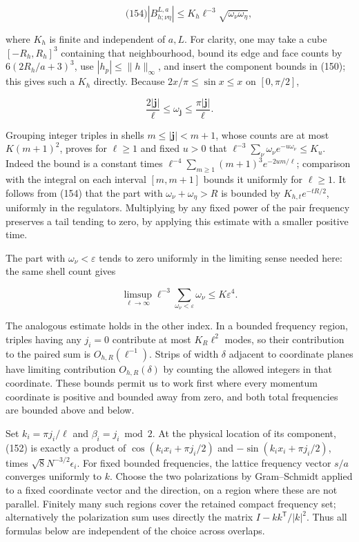 \[
\qquad\text{(154)}
 |B_{h;\nu\eta}^{L,a}|
       \le K_h\ell^{-3}\sqrt{\omega_\nu\omega_\eta},
\]

where \(K_h\) is finite and independent of \(a,L\). For clarity, one may
take a cube \([-R_h,R_h]^3\) containing that neighbourhood, bound its
edge and face counts by \(6(2R_h/a+3)^3\), use \(|h_p|\le\|h\|_\infty\),
and insert the component bounds in (150); this gives such a \(K_h\)
directly. Because \(2x/\pi\le\sin x\le x\) on \([0,\pi/2]\),

\[
\frac{2|\boldsymbol j|}{\ell}\le\omega_{\boldsymbol j}
       \le\frac{\pi|\boldsymbol j|}{\ell}.
\]

Grouping integer triples in shells \(m\le|\boldsymbol j|<m+1\), whose
counts are at most \(K(m+1)^2\), proves for \(\ell\ge1\) and fixed
\(u>0\) that \(\ell^{-3}\sum_\nu\omega_\nu e^{-u\omega_\nu}\le K_u\).
Indeed the bound is a constant times
\(\ell^{-4}\sum_{m\ge1}(m+1)^3e^{-2um/\ell}\); comparison with the
integral on each interval \([m,m+1]\) bounds it uniformly for
\(\ell\ge1\). It follows from (154) that the part with
\(\omega_\nu+\omega_\eta>R\) is bounded by \(K_{h,t}e^{-tR/2}\),
uniformly in the regulators. Multiplying by any fixed power of the pair
frequency preserves a tail tending to zero, by applying this estimate
with a smaller positive time.

The part with \(\omega_\nu<\varepsilon\) tends to zero uniformly in the
limiting sense needed here: the same shell count gives

\[
\limsup_{\ell\to\infty}\ell^{-3}
       \sum_{\omega_\nu<\varepsilon}\omega_\nu
       \le K\varepsilon^4.
\]

The analogous estimate holds in the other index. In a bounded frequency
region, triples having any \(j_i=0\) contribute at most \(K_R\ell^2\)
modes, so their contribution to the paired sum is
\(O_{h,R}(\ell^{-1})\). Strips of width \(\delta\) adjacent to
coordinate planes have limiting contribution \(O_{h,R}(\delta)\) by
counting the allowed integers in that coordinate. These bounds permit us
to work first where every momentum coordinate is positive and bounded
away from zero, and both total frequencies are bounded above and below.

Set \(k_i=\pi j_i/\ell\) and \(\beta_i=j_i\bmod2\). At the physical
location of its component, (152) is exactly a product of
\(\cos(k_ix_i+\pi j_i/2)\) and \(-\sin(k_ix_i+\pi j_i/2)\), times
\(\sqrt8N^{-3/2}\epsilon_i\). For fixed bounded frequencies, the lattice
frequency vector \(s/a\) converges uniformly to \(k\). Choose the two
polarizations by Gram--Schmidt applied to a fixed coordinate vector and
the direction, on a region where these are not parallel. Finitely many
such regions cover the retained compact frequency set; alternatively the
polarization sum uses directly the matrix \(I-kk^{\mathsf T}/|k|^2\).
Thus all formulas below are independent of the choice across overlaps.

